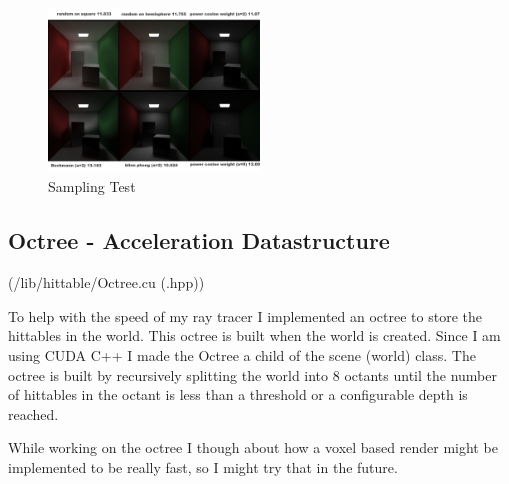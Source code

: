 \documentclass{article}
\begin{document}
        \begin{figure}[H]
            \centering
            \includegraphics[width=0.5\textwidth]{samples/Lighting_Comparison.png}
            \caption{Sampling Test}
        \end{figure}


    \subsection{Octree - Acceleration Datastructure}
    (/lib/hittable/Octree.cu (.hpp))\par 
    To help with the speed of my ray tracer I implemented an octree to store the hittables in the world. This octree is built when the world is created. Since I am using CUDA C++ I made the Octree a child of the scene (world) class. The octree is built by recursively splitting the world into 8 octants until the number of hittables in the octant is less than a threshold or a configurable depth is reached. \par 
    While working on the octree I though about how a voxel based render might be implemented to be really fast, so I might try that in the future. \par   
\end{document}
